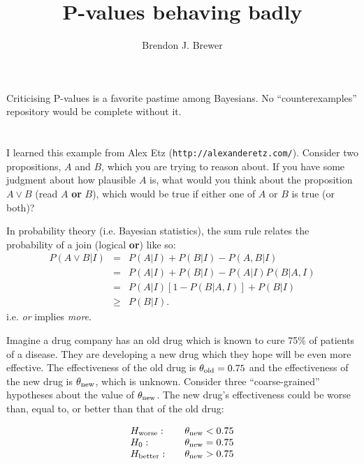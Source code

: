 \documentclass[a4paper, 12pt]{article}
\title{P-values behaving badly}
\author{Brendon J. Brewer}
\begin{document}
\maketitle

Criticising P-values is a favorite pastime among Bayesians. No
``counterexamples'' repository would be complete without it.

\section{}
I learned this example from Alex Etz ({\tt http://alexanderetz.com/}).
Consider two propositions, $A$ and $B$, which you are trying to reason about.
If you have some judgment about how plausible $A$ is, what would you think
about the proposition $A \vee B$ (read $A$ {\bf or} $B$), which would be true
if either one of $A$ or $B$ is true (or both)? 



In probability theory (i.e. Bayesian statistics), the sum rule relates the
probability of a join (logical {\bf or}) like so:
\begin{eqnarray}
P(A \vee B | I) &=& P(A | I) + P(B | I) - P(A, B | I)\\
                &=& P(A | I) + P(B | I) - P(A | I)P(B | A, I)\\
                &=& P(A | I)\left[1 - P(B | A,I)\right] + P(B | I)\\
                &\geq& P(B | I). 
\end{eqnarray}
i.e. {\em or} implies {\em more}.


Imagine a drug company has an old drug which is known to cure
75\% of patients of a disease. They are developing a new drug
which they hope will be even more effective.
The effectiveness of the old drug is $\theta_{\rm old} = 0.75$ and the
effectiveness of the new drug is $\theta_{\rm new}$, which is unknown.
Consider three ``coarse-grained''
hypotheses about the value of $\theta_{\rm new}$. The new drug's
effectiveness could be worse than, equal to, or better than that of the old
drug:

\begin{equation}
\begin{array}{lcl}
H_{\rm worse}:  &  &\theta_{\rm new} < 0.75\\
H_0:            &  &\theta_{\rm new} = 0.75\\
H_{\rm better}: &  &\theta_{\rm new} > 0.75
\end{array}
\end{equation}
\end{document}
